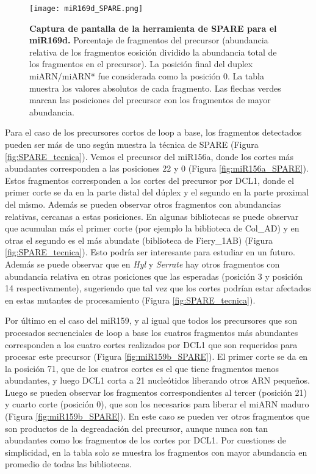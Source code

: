 \begin{landscape}                                                                      
\begin{figure}[htbp!] 
        \centering    
        \texttt{[image: miR169d\_SPARE.png]}
        \caption[Captura de pantalla de la herramienta de SPARE para el miR169d]{
        \textbf{Captura de pantalla de la herramienta de SPARE para el miR169d.}
        Porcentaje de fragmentos del precursor (abundancia relativa de los fragmentos eosición dividido la abundancia total de los fragmentos en el precursor).
        La posición final del duplex miARN/miARN* fue considerada como la posición 0.
        La tabla muestra los valores absolutos de cada fragmento.
        Las flechas verdes marcan las posiciones del precursor con los fragmentos de mayor abundancia. 
        }
	 \label{fig:miR169d_SPARE}
    \end{figure}
\end{landscape}

Para el caso de los precursores cortos de loop a base, los fragmentos detectados pueden ser más de uno según muestra la técnica de SPARE (Figura \ref{fig:SPARE_tecnica}).
Vemos el precursor del miR156a, donde los cortes más abundantes corresponden a las posiciones 22 y 0 (Figura \ref{fig:miR156a_SPARE}).
Estos fragmentos corresponden a los cortes del precursor por DCL1, donde el primer corte se da en la parte distal del dúplex y el segundo en la parte proximal del mismo.
Además se pueden observar otros fragmentos con abundancias relativas, cercanas a estas posiciones. 
En algunas bibliotecas se puede observar que acumulan más el primer corte (por ejemplo la biblioteca de Col\_AD) y en otras el segundo es el más abundate (biblioteca de Fiery\_1AB) (Figura \ref{fig:SPARE_tecnica}).
Esto podría ser interesante para estudiar en un futuro.
Además se puede observar que en \textit{Hyl} y \textit{Serrate} hay otros fragmentos con abundancia relativa en otras posiciones que las esperadas (posición 3 y posición 14 respectivamente), sugeriendo que tal vez que los cortes podrían estar afectados en estas mutantes de procesamiento (Figura \ref{fig:SPARE_tecnica}).

Por último en el caso del miR159, y al igual que todos los precursores que son procesados secuenciales de loop a base los cuatros fragmentos más abundantes corresponden a los cuatro cortes realizados por DCL1 que son requeridos para procesar este precursor (Figura \ref{fig:miR159b_SPARE}).
El primer corte se da en la posición 71, que de los cuatros cortes es el que tiene fragmentos menos abundantes, y luego DCL1 corta a 21 nucleótidos liberando otros ARN pequeños.
Luego se pueden observar los fragmentos correspondientes al tercer (posición 21) y cuarto corte (posición 0), que son los necesarios para liberar el miARN maduro (Figura \ref{fig:miR159b_SPARE}).
En este caso se pueden ver otros fragmentos que son productos de la degreadación del precursor, aunque nunca son tan abundantes como los fragmentos de los cortes por DCL1.
Por cuestiones de simplicidad, en la tabla solo se muestra los fragmentos con mayor abundancia en promedio de todas las bibliotecas.


